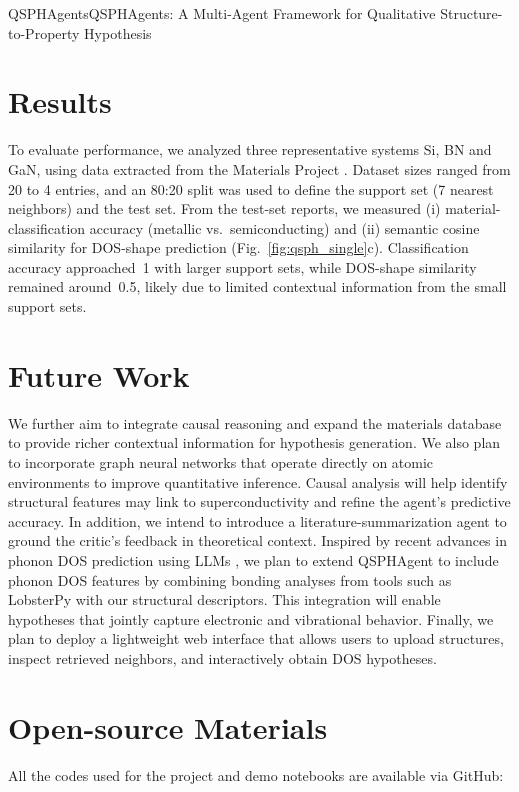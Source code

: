 \begin{teamsubmission}{QSPHAgents}{QSPHAgents: A Multi-Agent Framework for Qualitative Structure-to-Property Hypothesis}
\section*{Results}
To evaluate performance, we analyzed three representative systems Si, BN and GaN, using data extracted from the Materials Project \cite{jain2013commentary}. Dataset sizes ranged from 20 to 4 entries, and an 80:20 split was used to define the support set (7 nearest neighbors) and the test set. From the test-set reports, we measured (i) material-classification accuracy (metallic vs.\ semiconducting) and (ii) semantic cosine similarity for DOS-shape prediction (Fig.~\ref{fig:qsph_single}c). Classification accuracy approached~1 with larger support sets, while DOS-shape similarity remained around~0.5, likely due to limited contextual information from the small support sets.


\section*{Future Work}

 We further aim to integrate causal reasoning and expand the materials database to provide richer contextual information for hypothesis generation. We also plan to incorporate graph neural networks that operate directly on atomic environments to improve quantitative inference. Causal analysis will help identify structural features may link to  superconductivity and refine the agent’s predictive accuracy. In addition, we intend to introduce a literature-summarization agent to ground the critic’s feedback in theoretical context. Inspired by recent advances in phonon DOS prediction using LLMs \cite{llm2024}, we plan to extend QSPHAgent to include phonon DOS features by combining bonding analyses from tools such as LobsterPy \cite{Naik2024,Janine2022} with our structural descriptors. This integration will enable hypotheses that jointly capture electronic and vibrational behavior. Finally, we plan to deploy a lightweight web interface that allows users to upload structures, inspect retrieved neighbors, and interactively obtain DOS hypotheses.

\section*{Open-source Materials}

All the codes used for the project and demo notebooks are available via GitHub: 


\end{teamsubmission}
